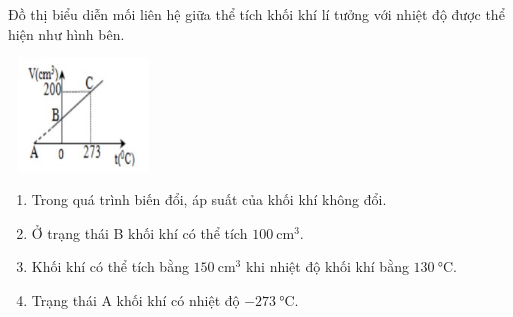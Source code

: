 \begin{ex}
	Đồ thị biểu diễn mối liên hệ giữa thể tích khối khí lí tưởng với nhiệt độ được thể hiện như hình bên.
	\begin{center}
		\includegraphics[width=4cm, height=3cm]{figs/VN12-Y24-PH-SYL-014P-16}
	\end{center}
	\begin{enumerate}[label=\alph*)]
		\item Trong quá trình biến đổi, áp suất của khối khí không đổi.
		\item Ở trạng thái B khối khí có thể tích $\SI{100}{\centi\meter^3}$.
		\item Khối khí có thể tích bằng $\SI{150}{\centi\meter^3}$ khi nhiệt độ khối khí bằng $\SI{130}{\celsius}$.
		\item Trạng thái A khối khí có nhiệt độ $\SI{-273}{\celsius}$.
	\end{enumerate}
	
\end{ex}
